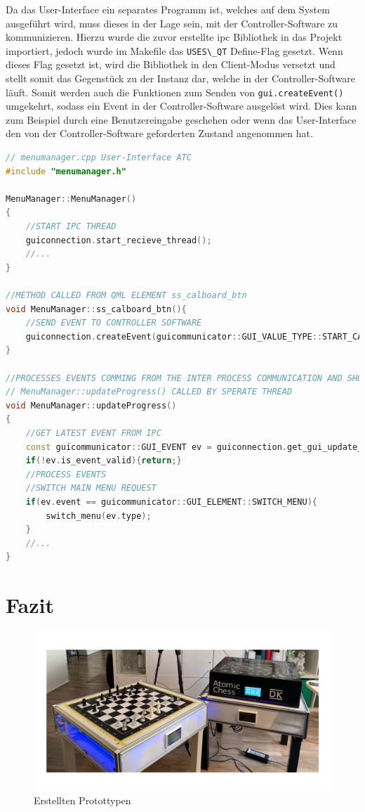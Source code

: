 Da das User-Interface ein separates Programm ist, welches auf dem System
ausgeführt wird, muss dieses in der Lage sein, mit der
Controller-Software zu kommunizieren. Hierzu wurde die zuvor erstellte
\gls{ipc} Bibliothek in das Projekt importiert, jedoch wurde im Makefile
das \passthrough{\lstinline!USES\_QT!} Define-Flag gesetzt. Wenn dieses
Flag gesetzt ist, wird die Bibliothek in den Client-Modus versetzt und
stellt somit das Gegenstück zu der Instanz dar, welche in der
Controller-Software läuft. Somit werden auch die Funktionen zum Senden
von \passthrough{\lstinline!gui.createEvent()!} umgekehrt, sodass ein
Event in der Controller-Software ausgelöst wird. Dies kann zum Beispiel
durch eine Benutzereingabe geschehen oder wenn das User-Interface den
von der Controller-Software geforderten Zustand angenommen hat.

\begin{lstlisting}[language={C++}]
// menumanager.cpp User-Interface ATC
#include "menumanager.h"

MenuManager::MenuManager()
{
    //START IPC THREAD
    guiconnection.start_recieve_thread();
    //...
}

//METHOD CALLED FROM QML ELEMENT ss_calboard_btn
void MenuManager::ss_calboard_btn(){
    //SEND EVENT TO CONTROLLER SOFTWARE
    guiconnection.createEvent(guicommunicator::GUI_VALUE_TYPE::START_CALBOARD_PROC);
}

//PROCESSES EVENTS COMMING FROM THE INTER PROCESS COMMUNICATION AND SHOWS MENUS OR SET IMAGES/LABES
// MenuManager::updateProgress() CALLED BY SPERATE THREAD
void MenuManager::updateProgress()
{
    //GET LATEST EVENT FROM IPC
    const guicommunicator::GUI_EVENT ev = guiconnection.get_gui_update_event();
    if(!ev.is_event_valid){return;}
    //PROCESS EVENTS
    //SWITCH MAIN MENU REQUEST
    if(ev.event == guicommunicator::GUI_ELEMENT::SWITCH_MENU){
        switch_menu(ev.type);
    }
    //...
}
\end{lstlisting}

\hypertarget{fazit}{%
\chapter{Fazit}\label{fazit}}

\begin{figure}
\centering
\includegraphics{images/ATC_PROD_TABLE_FINAL_IMG.png}
\caption{Erstellten Protottypen \label{ATC_PROD_TABLE_FINAL_IMG}}
\end{figure}

